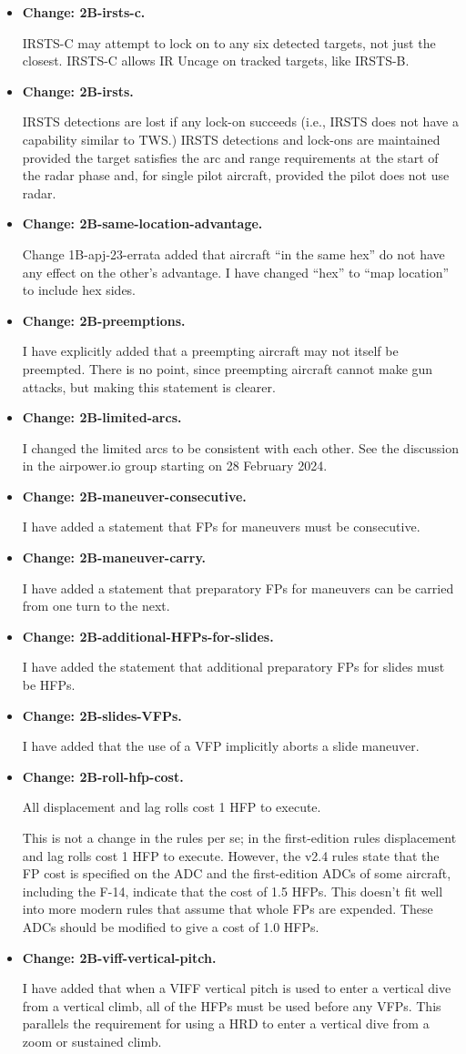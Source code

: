 \documentclass[10pt]{report}
\newcommand{\itemtag}[1]{\item \textbf{Change: #1.}\par}
\begin{document}
\begin{itemize}
    \itemtag{2B-irsts-c} IRSTS-C may attempt to lock on to any six detected targets, not just the closest. IRSTS-C allows IR Uncage on tracked targets, like IRSTS-B.
    
    \itemtag{2B-irsts} IRSTS detections are lost if any lock-on succeeds (i.e., IRSTS does not have a capability similar to TWS.) IRSTS detections and lock-ons are maintained provided the target satisfies the arc and range requirements at the start of the radar phase and, for single pilot aircraft, provided the pilot does not use radar.

    \itemtag{2B-same-location-advantage} Change 1B-apj-23-errata added that aircraft “in the same hex” do not have any effect on the other's advantage. I have changed “hex” to “map location” to include hex sides.

    \itemtag{2B-preemptions} I have explicitly added that a preempting aircraft may not itself be preempted. There is no point, since preempting aircraft cannot make gun attacks, but making this statement is clearer.

    \itemtag{2B-limited-arcs} I changed the limited arcs to be consistent with each other. See the discussion in the airpower.io group starting on 28 February 2024.

    \itemtag{2B-maneuver-consecutive} I have added a statement that FPs for maneuvers must be consecutive.

    \itemtag{2B-maneuver-carry} I have added a statement that preparatory FPs for maneuvers can be carried from one turn to the next.
    
    \itemtag{2B-additional-HFPs-for-slides} I have added the statement that additional preparatory FPs for slides must be HFPs.
    
    \itemtag{2B-slides-VFPs}{I have added that the use of a VFP implicitly aborts a slide maneuver.}

    \itemtag{2B-roll-hfp-cost} All displacement and lag rolls cost 1 HFP to execute.

    This is not a change in the rules per se; in the first-edition rules displacement and lag rolls cost 1 HFP to execute. However, the v2.4 rules state that the FP cost is specified on the ADC and the first-edition ADCs of some aircraft, including the F-14, indicate that the cost of 1.5 HFPs. This doesn't fit well into more modern rules that assume that whole FPs are expended. These ADCs should be modified to give a cost of 1.0 HFPs.
    
    \itemtag{2B-viff-vertical-pitch} I have added that when a VIFF vertical pitch is used to enter a vertical dive from a vertical climb, all of the HFPs must be used before any VFPs. This parallels the requirement for using a HRD to enter a vertical dive from a zoom or sustained climb.


\end{itemize}
\end{document}
